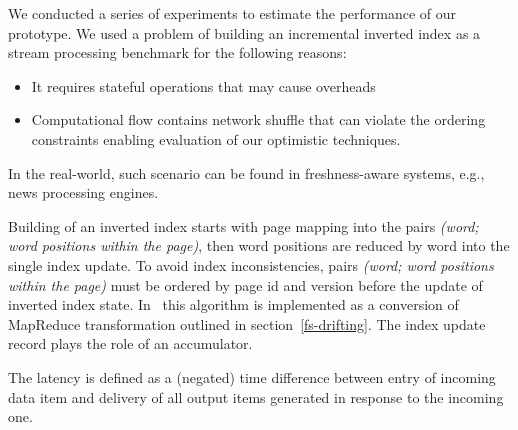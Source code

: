 
\label{fs-experiments-section}

We conducted a  series of experiments to estimate the performance of our  prototype. 
We used a problem of building an incremental inverted index as a stream processing benchmark  for the following reasons:

\begin{itemize}
    \item It requires stateful operations that may cause overheads
    \item Computational flow contains network shuffle that can violate the ordering constraints %
    enabling evaluation of our optimistic techniques.
\end{itemize}

In the real-world, such scenario can be found in freshness-aware systems, e.g., news processing engines.

Building of an inverted index %
starts with page mapping into the pairs {\it (word; word positions within the page)}, then  word positions are reduced by word into the single index update. 
%
To avoid index inconsistencies, pairs {\it (word; word positions within the page)} must be ordered by page id and version before the update of inverted index state. 
In \FlameStream\ this algorithm is implemented as a conversion of MapReduce transformation 
outlined in  section~\ref{fs-drifting}.
The index update record plays the role of an accumulator. 

The latency is defined as a (negated) time difference between entry of incoming data item and delivery of all output items generated in response to the incoming one.


